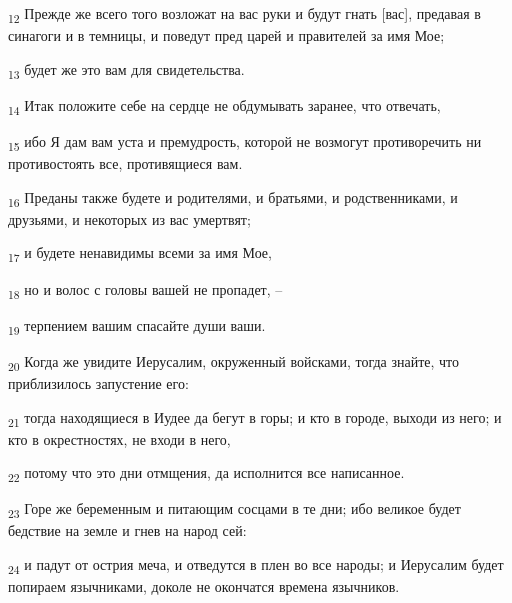 \begin{tcolorbox}
\textsubscript{12} Прежде же всего того возложат на вас руки и будут гнать [вас], предавая в синагоги и в темницы, и поведут пред царей и правителей за имя Мое;
\end{tcolorbox}
\begin{tcolorbox}
\textsubscript{13} будет же это вам для свидетельства.
\end{tcolorbox}
\begin{tcolorbox}
\textsubscript{14} Итак положите себе на сердце не обдумывать заранее, что отвечать,
\end{tcolorbox}
\begin{tcolorbox}
\textsubscript{15} ибо Я дам вам уста и премудрость, которой не возмогут противоречить ни противостоять все, противящиеся вам.
\end{tcolorbox}
\begin{tcolorbox}
\textsubscript{16} Преданы также будете и родителями, и братьями, и родственниками, и друзьями, и некоторых из вас умертвят;
\end{tcolorbox}
\begin{tcolorbox}
\textsubscript{17} и будете ненавидимы всеми за имя Мое,
\end{tcolorbox}
\begin{tcolorbox}
\textsubscript{18} но и волос с головы вашей не пропадет, --
\end{tcolorbox}
\begin{tcolorbox}
\textsubscript{19} терпением вашим спасайте души ваши.
\end{tcolorbox}
\begin{tcolorbox}
\textsubscript{20} Когда же увидите Иерусалим, окруженный войсками, тогда знайте, что приблизилось запустение его:
\end{tcolorbox}
\begin{tcolorbox}
\textsubscript{21} тогда находящиеся в Иудее да бегут в горы; и кто в городе, выходи из него; и кто в окрестностях, не входи в него,
\end{tcolorbox}
\begin{tcolorbox}
\textsubscript{22} потому что это дни отмщения, да исполнится все написанное.
\end{tcolorbox}
\begin{tcolorbox}
\textsubscript{23} Горе же беременным и питающим сосцами в те дни; ибо великое будет бедствие на земле и гнев на народ сей:
\end{tcolorbox}
\begin{tcolorbox}
\textsubscript{24} и падут от острия меча, и отведутся в плен во все народы; и Иерусалим будет попираем язычниками, доколе не окончатся времена язычников.
\end{tcolorbox}
